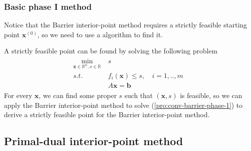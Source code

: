 \subsubsection{Basic phase I method}
Notice that the Barrier interior-point method requires a
strictly feasible starting point $\mathbf{x}^{(0)}$,
so we need to use a algorithm to find it.
\par
A strictly feasible point can be found by solving the
following problem
\begin{align}
    \begin{array}{lll}
        \min_{\mathbf{x} \in \mathbb{R}^n, s \in \mathbb{R}} \ &s \\
        s.t. \ &f_i(\mathbf{x}) \leq s, \quad i = 1,.., m \\
        &A\mathbf{x} = \mathbf{b}
    \end{array}
    \label{pro:conv-barrier-phase-1}
\end{align}
For every $\mathbf{x}$, we can find some proper $s$
such that $(\mathbf{x}, s)$ is feasible, so we can apply
the Barrier interior-point method to solve (\ref{pro:conv-barrier-phase-1})
to derive a strictly feasible point for the Barrier interior-point method.

\subsection{Primal-dual interior-point method}

